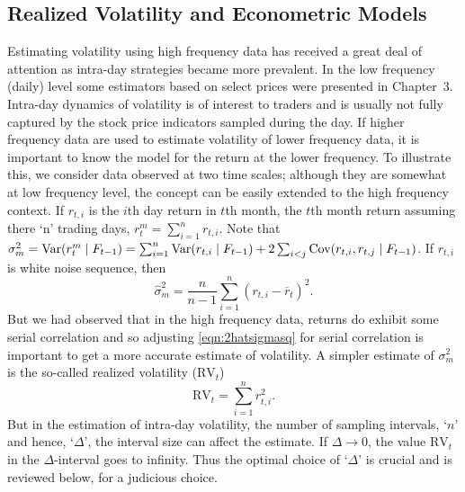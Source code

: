 \subsection{Realized Volatility and Econometric Models} \label{in:disc_time_unit2}

Estimating volatility using high frequency data has received a great deal of attention as intra-day strategies became more prevalent. In the low frequency (daily) level some estimators based on select prices were presented in Chapter~3. Intra-day dynamics of volatility is of interest to traders and is usually not fully captured by the stock price indicators sampled during the day. If higher frequency data are used to estimate volatility of lower frequency data, it is important to know the model for the return at the lower frequency. To illustrate this, we consider data observed at two time scales; although they are somewhat at low frequency level, the concept can be easily extended to the high frequency context. If $r_{t,i}$ is the $i$th day return in $t$th month, the $t$th month return assuming there `n' trading days, $r_t^m = \sum_{i=1}^n r_{t,i}$. Note that $\sigma_m^2 = \operatorname{Var}(r_t^m \;|\; F_{t-1}) = \sum_{i=1}^n \operatorname{Var}(r_{t,i} \;|\; F_{t-1}) + 2 \sum_{i<j} \operatorname{Cov}(r_{t,i}, r_{t,j} \;|\; F_{t-1})$. If $r_{t,i}$ is white noise sequence, then
	\begin{equation}\label{eqn:2hatsigmasq}
	\hat{\sigma}_m^2 = \frac{n}{n-1} \sum_{i=1}^n (r_{t,i} - \overline{r}_t)^2.
	\end{equation}
But we had observed that in the high frequency data, returns do exhibit some serial correlation and so adjusting \eqref{eqn:2hatsigmasq} for serial correlation is important to get a more accurate estimate of volatility. A simpler estimate of $\sigma_m^2$ is the so-called realized volatility ($\text{RV}_t$)
	\begin{equation} \label{eqn:2RV}
	\text{RV}_t = \sum_{i=1}^n r_{t,i}^2.
	\end{equation}
But in the estimation of intra-day volatility, the number of sampling intervals, `$n$' and hence, `$\Delta$', the interval size can affect the estimate. If $\Delta \rightarrow 0$, the value $\text{RV}_t$ in the $\Delta$-interval goes to infinity. Thus the optimal choice of `$\Delta$' is crucial and is reviewed below, for a judicious choice.


